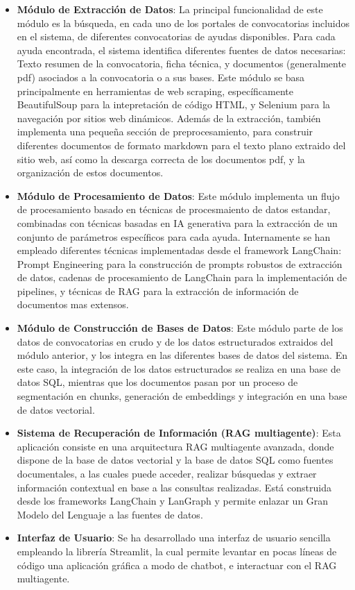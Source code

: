 \begin{itemize}
    \item \textbf{Módulo de Extracción de Datos}:
    La principal funcionalidad de este módulo es la búsqueda, en cada uno de los portales de convocatorias incluidos en el sistema, de diferentes convocatorias de ayudas disponibles.
    Para cada ayuda encontrada, el sistema identifica diferentes fuentes de datos necesarias: Texto resumen de la convocatoria, ficha técnica, y documentos (generalmente pdf) asociados a la convocatoria o a sus bases.
    Este módulo se basa principalmente en herramientas de web scraping, específicamente BeautifulSoup para la intepretación de código HTML, y Selenium para la navegación por sitios web dinámicos.
    Además de la extracción, también implementa una pequeña sección de preprocesamiento, para construir diferentes documentos de formato markdown para el texto plano extraido del sitio web, así como la descarga correcta de los documentos pdf, y la organización de estos documentos.

    \item \textbf{Módulo de Procesamiento de Datos}:
    Este módulo implementa un flujo de procesamiento basado en técnicas de procesmaiento de datos estandar, combinadas con técnicas basadas en IA generativa para la extracción de un conjunto de parámetros específicos para cada ayuda.
    Internamente se han empleado diferentes técnicas implementadas desde el framework LangChain: Prompt Engineering para la construcción de prompts robustos de extracción de datos, cadenas de procesamiento de LangChain para la implementación de pipelines, y técnicas de RAG para la extracción de información de documentos mas extensos.
    
    \item \textbf{Módulo de Construcción de Bases de Datos}:
    Este módulo parte de los datos de convocatorias en crudo y de los datos estructurados extraidos del módulo anterior, y los integra en las diferentes bases de datos del sistema.
    En este caso, la integración de los datos estructurados se realiza en una base de datos SQL, mientras que los documentos pasan por un proceso de segmentación en chunks, generación de embeddings y integración en una base de datos vectorial.

    \item \textbf{Sistema de Recuperación de Información (RAG multiagente)}:
    Esta aplicación consiste en una arquitectura RAG multiagente avanzada, donde dispone de la base de datos vectorial y la base de datos SQL como fuentes documentales, a las cuales puede acceder, realizar búsquedas y extraer información contextual en base a las consultas realizadas.
    Está construida desde los frameworks LangChain y LanGraph y permite enlazar un Gran Modelo del Lenguaje a las fuentes de datos.
    \item \textbf{Interfaz de Usuario}:
    Se ha desarrollado una interfaz de usuario sencilla empleando la librería Streamlit, la cual permite levantar en pocas líneas de código una aplicación gráfica a modo de chatbot, e interactuar con el RAG multiagente.
\end{itemize}



